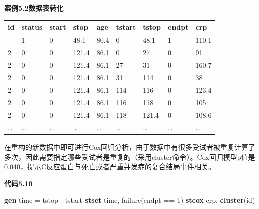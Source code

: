 \documentclass[
  chinese-hans,
  letterpaper,
  DIV=11,
  numbers=noendperiod]{scrreprt}
\newenvironment{Shaded}{\begin{snugshade}}{\end{snugshade}}
\newcommand{\KeywordTok}[1]{\textcolor[rgb]{0.00,0.23,0.31}{\textbf{#1}}}
\newcommand{\NormalTok}[1]{\textcolor[rgb]{0.00,0.23,0.31}{#1}}
\newcounter{none} %
\begin{document}
\textbf{案例5.2数据表转化}

{\def\LTcaptype{none} %
\begin{longtable}[]{@{}lllllllll@{}}
\toprule\noalign{}
id & status & start & stop & age & tstart & tstop & endpt & crp \\
\midrule\noalign{}
\endhead
\bottomrule\noalign{}
\endlastfoot
1 & 1 & 0 & 48.1 & 80.4 & 0 & 48.1 & 1 & 110.1 \\
2 & 0 & 0 & 121.4 & 86.1 & 0 & 27 & 0 & 91 \\
2 & 0 & 0 & 121.4 & 86.1 & 27 & 31 & 0 & 160.7 \\
2 & 0 & 0 & 121.4 & 86.1 & 31 & 114 & 0 & 38 \\
2 & 0 & 0 & 121.4 & 86.1 & 114 & 116 & 0 & 123.4 \\
2 & 0 & 0 & 121.4 & 86.1 & 116 & 118 & 0 & 105 \\
2 & 0 & 0 & 121.4 & 86.1 & 118 & 121.4 & 0 & 108.6 \\
\ldots{} & \ldots{} & \ldots{} & \ldots{} & \ldots{} & \ldots{} &
\ldots{} & \ldots{} & \ldots{} \\
\end{longtable}
}

在重构的新数据中即可进行Cox回归分析，由于数据中有很多受试者被重复计算了多次，因此需要指定哪些受试者是重复的（采用cluster命令）。Cox回归模型p值是0.040，提示C反应蛋白与死亡或者严重并发症的复合结局事件相关。

\begin{tcolorbox}[enhanced jigsaw, arc=.35mm, bottomrule=.15mm, breakable, colback=white, colframe=quarto-callout-note-color-frame, left=2mm, leftrule=.75mm, opacityback=0, rightrule=.15mm, toprule=.15mm]

\vspace{-3mm}\textbf{代码5.10}\vspace{3mm}

\begin{Shaded}
\begin{Highlighting}[]
\KeywordTok{gen}\NormalTok{ time = tstop {-} tstart}
\KeywordTok{stset}\NormalTok{ time, failure(endpt == 1)}
\KeywordTok{stcox}\NormalTok{ crp, }\KeywordTok{cluster}\NormalTok{(id)}
\end{Highlighting}
\end{Shaded}

\end{tcolorbox}
\end{document}
